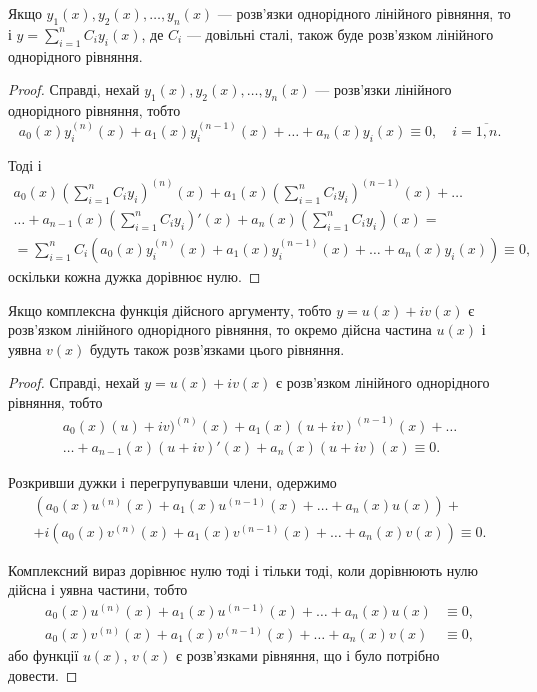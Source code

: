 \begin{theorem}
	Якщо $y_1(x), y_2(x), \ldots, y_n(x)$ --- розв'язки однорідного лінійного рівняння, то і  $y = \sum_{i=1}^n C_i y_i(x)$, де $C_i$ --- довільні сталі, також буде розв'язком лінійного однорідного рівняння.
\end{theorem}

\begin{proof}
	Справді, нехай $y_1(x), y_2(x), \ldots, y_n(x)$ --- розв'язки лінійного однорідного рівняння, тобто
	\begin{equation*}
		a_0(x) y_i^{(n)} (x) + a_1(x) y_i^{(n - 1)} (x) + \ldots + a_n(x) y_i(x) \equiv 0, \quad i = \overline{1, n}.
	\end{equation*}
	
	Тоді і   
 	\begin{multline*}
 		a_0(x) \left(\sum_{i=1}^n C_i y_i\right)^{(n)} (x) + a_1(x) \left(\sum_{i=1}^n C_i y_i\right)^{(n - 1)} (x) + \ldots \\
 		\ldots + a_{n-1}(x) \left(\sum_{i=1}^n C_i y_i\right)'(x) + a_n(x) \left(\sum_{i=1}^n C_i y_i\right)(x) = \\
 		= \sum_{i=1}^n C_i  \left( a_0(x) y_i^{(n)} (x) + a_1(x) y_i^{(n - 1)} (x) + \ldots + a_n(x) y_i(x) \right) \equiv 0,
 	\end{multline*}
	оскільки кожна дужка дорівнює нулю.
\end{proof}

\begin{theorem}
	Якщо комплексна функція дійсного аргументу, тобто $y = u(x) + i v(x)$ є розв'язком лінійного однорідного рівняння, то окремо дійсна частина $u(x)$ і уявна $v(x)$ будуть також розв'язками цього рівняння.
\end{theorem}

\begin{proof}
	Справді, нехай $y = u(x) + i v(x)$ є розв'язком лінійного однорідного рівняння, тобто
	\begin{multline*}
		a_0(x) (u) + i v)^{(n)} (x) + a_1(x) (u + i v)^{(n - 1)} (x) + \ldots \\
		\ldots + a_{n - 1}(x) (u + i v)' (x) + a_n(x) (u + i v) (x) \equiv 0.
	\end{multline*}

	Розкривши дужки і перегрупувавши члени, одержимо
	\begin{multline*}
		\left( a_0(x) u^{(n)}(x) + a_1(x) u^{(n - 1)} (x) + \ldots + a_n(x) u(x) \right) + \\
		+ i \left( a_0(x) v^{(n)}(x) + a_1(x) v^{(n - 1)} (x) + \ldots + a_n(x) v(x) \right) \equiv 0.
	\end{multline*}

	Комплексний вираз дорівнює нулю тоді і тільки тоді, коли дорівнюють нулю дійсна і уявна частини, тобто
 	\begin{align*}
		a_0(x) u^{(n)}(x) + a_1(x) u^{(n - 1)} (x) + \ldots + a_n(x) u(x) &\equiv 0, \\
		a_0(x) v^{(n)}(x) + a_1(x) v^{(n - 1)} (x) + \ldots + a_n(x) v(x) &\equiv 0,
	\end{align*}
	або функції $u(x)$, $v(x)$ є розв'язками рівняння, що і було потрібно довести.
\end{proof}

